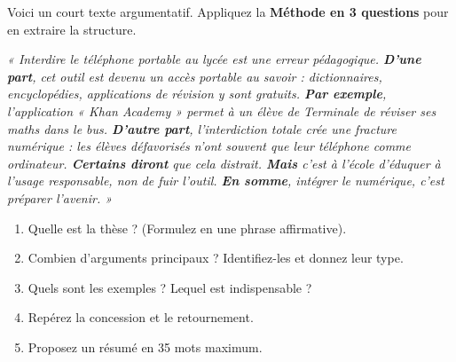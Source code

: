 \documentclass[11pt]{article}
\begin{document}
\begin{exercice}
Voici un court texte argumentatif. Appliquez la \textbf{Méthode en 3 questions} pour en extraire la structure.

\textit{« Interdire le téléphone portable au lycée est une erreur pédagogique. \textbf{D'une part}, cet outil est devenu un accès portable au savoir : dictionnaires, encyclopédies, applications de révision y sont gratuits. \textbf{Par exemple}, l'application « Khan Academy » permet à un élève de Terminale de réviser ses maths dans le bus. \textbf{D'autre part}, l'interdiction totale crée une fracture numérique : les élèves défavorisés n'ont souvent que leur téléphone comme ordinateur. \textbf{Certains diront} que cela distrait. \textbf{Mais} c'est à l'école d'éduquer à l'usage responsable, non de fuir l'outil. \textbf{En somme}, intégrer le numérique, c'est préparer l'avenir. »}

\begin{enumerate}
    \item Quelle est la thèse ? (Formulez en une phrase affirmative).
    \item Combien d'arguments principaux ? Identifiez-les et donnez leur type.
    \item Quels sont les exemples ? Lequel est indispensable ?
    \item Repérez la concession et le retournement.
    \item Proposez un résumé en 35 mots maximum.
\end{enumerate}
\end{exercice}
\end{document}

